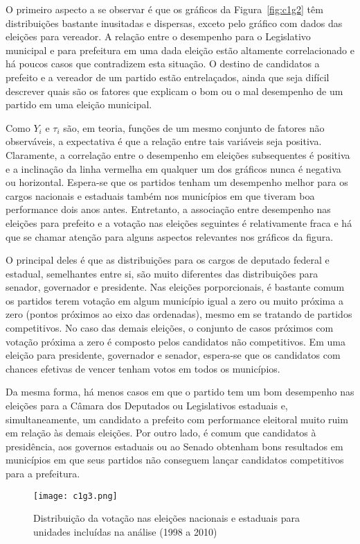 O primeiro aspecto a se observar é que os gráficos da Figura~\ref{fig:c1g2} têm distribuições bastante inusitadas e dispersas, exceto pelo gráfico com dados das eleições para vereador. A relação entre o desempenho para o Legislativo municipal e para prefeitura em uma dada eleição estão altamente correlacionado e há poucos casos que contradizem esta situação. O destino de candidatos a prefeito e a vereador de um partido estão entrelaçados, ainda que seja difícil descrever quais são os fatores que explicam o bom ou o mal desempenho de um partido em uma eleição municipal.

Como $Y_{i}$ e $\tau_{i}$ são, em teoria, funções de um mesmo conjunto de fatores não observáveis, a expectativa é que a relação entre tais variáveis seja positiva. Claramente, a correlação entre o desempenho em eleições subsequentes é positiva e a inclinação da linha vermelha em qualquer um dos gráficos nunca é negativa ou horizontal. Espera-se que os partidos tenham um desempenho melhor para os cargos nacionais e estaduais também nos municípios em que tiveram boa performance dois anos antes. Entretanto, a associação entre desempenho nas eleições para prefeito e a votação nas eleições seguintes é relativamente fraca e há que se chamar atenção para alguns aspectos relevantes nos gráficos da figura.

O principal deles é que as distribuições para os cargos de deputado federal e estadual, semelhantes entre si, são muito diferentes das distribuições para senador, governador e presidente. Nas eleições porporcionais, é bastante comum os partidos terem votação em algum município igual a zero ou muito próxima a zero (pontos próximos ao eixo das ordenadas), mesmo em se tratando de partidos competitivos. No caso das demais eleições, o conjunto de casos próximos com votação próxima a zero é composto pelos candidatos não competitivos. Em uma eleição para presidente, governador e senador, espera-se que os candidatos com chances efetivas de vencer tenham votos em todos os municípios.

Da mesma forma, há menos casos em que o partido tem um bom desempenho nas eleições para a Câmara dos Deputados ou Legislativos estaduais e, simultaneamente, um candidato a prefeito com performance eleitoral muito ruim em relação às demais eleições. Por outro lado, é comum que candidatos à presidência, aos governos estaduais ou ao Senado obtenham bons resultados em municípios em que seus partidos não conseguem lançar candidatos competitivos para a prefeitura.

\begin{figure}[htp]
	\centering
	\texttt{[image: c1g3.png]}
	\caption{Distribuição da votação nas eleições nacionais e estaduais para unidades incluídas na análise (1998 a 2010)}
	\label{fig:c1g3} 
\end{figure}

